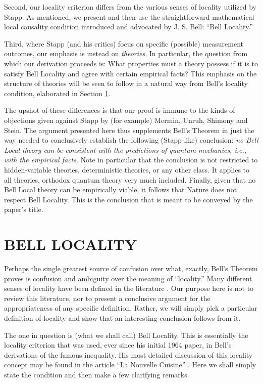 \documentclass[aps,prc,onecolumn,12pt,nofootinbib]{revtex4-2}
\begin{document}
Second, our locality criterion differs from the various
senses of locality utilized by Stapp.  As mentioned, we present and
then use the straightforward mathematical local
causality condition introduced and advocated by J. S. Bell:  ``Bell
Locality.''

Third, where Stapp (and his critics) focus on specific (possible)
measurement outcomes, our emphasis is instead on \emph{theories}.  In
particular, the question from which our derivation proceeds is:  What
properties must a theory possess if it is to satisfy Bell Locality and
agree with certain empirical facts?  This emphasis on the structure of
theories will be seen to follow in a natural way from
Bell's locality condition, elaborated in Section \ref{sec2}.

The upshot of these differences is that our proof is immune to the
kinds of objections given against Stapp by (for example) Mermin,
Unruh, Shimony and Stein.  The argument
presented here thus supplements Bell's Theorem in just the way
needed to conclusively establish the following (Stapp-like)
conclusion:  \emph{no Bell Local theory can be consistent with the
predictions of quantum mechanics, i.e., with the empirical facts}.
Note in particular that the conclusion is not
restricted to hidden-variable theories, deterministic theories, or any
other class.  It applies to all theories, orthodox quantum theory very
much included.  Finally, given that no Bell Local theory can be
empirically viable, it follows that Nature does not respect
Bell Locality.  This is the conclusion that is meant to be conveyed by
the paper's title.



\section{BELL LOCALITY}
\label{sec2}

Perhaps the single greatest source of confusion over what, exactly,
Bell's Theorem proves is confusion and ambiguity over the meaning of
``locality.''  Many different senses of locality have been defined in the
literature \cite{maudlin,eberhard}.  Our purpose here is not to review
this literature, nor to
present a conclusive argument for the appropriateness of any
specific definition.  Rather,
we will simply pick a particular definition of locality and show that
an interesting conclusion follows from it.

The one in question is (what we shall call) Bell Locality.  This is
essentially the locality criterion that was used, ever since his
initial 1964 paper, in Bell's derivations of the famous inequality.
His most detailed discussion of this locality concept may be found
in the article ``La Nouvelle Cuisine'' \cite[pages 232-48]{bell}.
Here we shall simply state the condition and then make a few clarifying
remarks.
\end{document}
